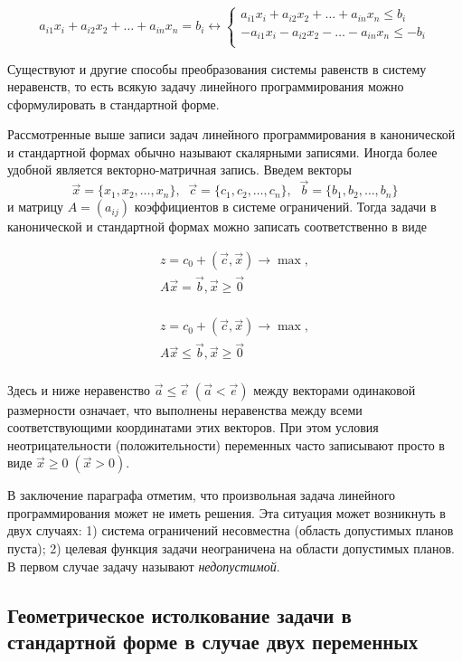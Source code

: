 $$
a_{i1}x_i+a_{i2}x_2+\dots+a_{in}x_n=b_i	\leftrightarrow
\left\{
\begin{array}{ll}
	a_{i1}x_i + a_{i2}x_2 + \dots + a_{in}x_n \leq b_i\\
	- a_{i1}x_i - a_{i2}x_2 - \dots - a_{in}x_n \leq - b_i\\
\end{array}
\right.
$$

Существуют и другие способы преобразования системы равенств в систему неравенств, то есть всякую задачу линейного программирования можно сформулировать в стандартной форме.

Рассмотренные выше записи задач линейного программирования в канонической и стандартной формах обычно называют скалярными записями. Иногда более удобной является векторно-матричная запись. Введем векторы
$$
\vec x=\{x_1, x_2, \dots, x_n \}, \;\; \vec c=\{c_1, c_2, \dots, c_n \}, \;\; \vec b=\{b_1, b_2, \dots, b_n \}
$$
и матрицу $A=(a_{ij})$ коэффициентов в системе ограничений. Тогда задачи в канонической и стандартной формах можно записать соответственно в виде

$$
\begin{array}{ll}
z = c_0 + (\vec c, \vec x) \rightarrow \max, \\
A\vec x= \vec b, \vec x \geq \vec 0 \\
\end{array}
$$

$$
\begin{array}{ll}
z = c_0 + (\vec c, \vec x) \rightarrow \max, \\
A\vec x\leq \vec b, \vec x \geq \vec 0 \\
\end{array}
$$

Здесь и ниже неравенство $\vec a \leq \vec e \;(\vec a < \vec e)$ между векторами одинаковой размерности означает, что выполнены неравенства между всеми соответствующими координатами этих векторов. При этом условия неотрицательности (положительности) переменных часто записывают просто в виде $\vec x \geq 0 \; (\vec x > 0)$.

В заключение параграфа отметим, что произвольная задача линейного программирования может не иметь решения. Эта ситуация может возникнуть в двух случаях: 1) система ограничений несовместна (область допустимых планов пуста); 2) целевая функция задачи неограничена на области допустимых планов. В первом случае задачу называют \textit{недопустимой}.

\subsection{Геометрическое истолкование задачи в стандартной форме в случае двух переменных}

